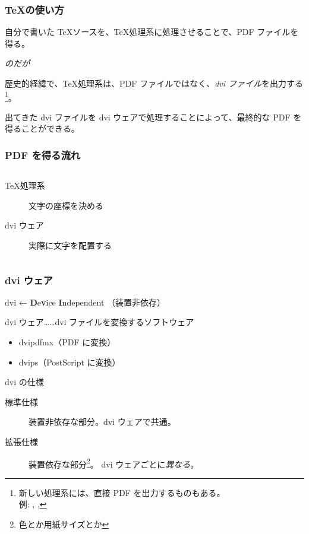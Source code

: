 \documentclass[unicode,12pt,colorlinks,handout]{beamer}
\newcommand{\centeralign}[1]{\rule{0pt}{0pt}\hfill#1\hfill\rule{0pt}{0pt}}
\begin{document}
\begin{frame}
	\frametitle{\TeX の使い方}
	自分で書いた \TeX ソースを、\TeX 処理系に処理させることで、PDF ファイルを得る。\par
	\pause
	\centeralign{\emph{のだが}}\par
	\pause
	歴史的経緯で、\TeX 処理系は、PDF ファイルではなく、\emph{dvi ファイル}を出力する
	\footnote{新しい処理系には、直接 PDF を出力するものもある。\\例: \pdfTeX, \LuaTeX, \XeTeX}。
	
	出てきた dvi ファイルを dvi ウェアで処理することによって、最終的な PDF を得ることができる。
\end{frame}

\begin{frame}
	\frametitle{PDF を得る流れ}
	\begin{columns}[c]
		\begin{column}{0.6\textwidth}
			\begin{description}
				\item[\TeX 処理系] 文字の座標を決める
				\item[dvi ウェア] 実際に文字を配置する
			\end{description}
		\end{column}
		\begin{column}{0.4\textwidth}
			\centering
		\end{column}
	\end{columns}
\end{frame}

\begin{frame}
	\frametitle{dvi ウェア}
	dvi ← \textbf{D}e\textbf{v}ice \textbf{I}ndependent （装置非依存）
	
	dvi ウェア……dvi ファイルを変換するソフトウェア
	
	\begin{itemize}
		\item dvipdfmx（PDF に変換）
		\item dvips（PostScript に変換）
	\end{itemize}
	
	\begin{block}{dvi の仕様}
		\begin{description}
			\item[標準仕様] 装置非依存な部分。dvi ウェアで共通。
			\item[拡張仕様] 装置依存な部分\footnote{色とか用紙サイズとか}。
				dvi ウェアごとに\emph{異なる}。
		\end{description}
	\end{block}
\end{frame}
\end{document}

